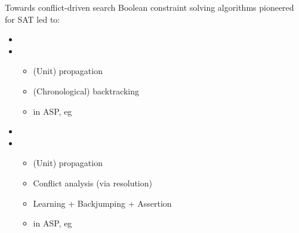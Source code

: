 \begin{frame}{Towards conflict-driven search}
  \bigskip
  Boolean constraint solving algorithms pioneered for SAT led to:
  \medskip
  \begin{itemize}\itemsep -1pt
  \item<1-> 
  \item<1-> [] 
    \begin{itemize}
    \item (Unit) propagation
    \item (Chronological) backtracking
    \medskip
    \item in ASP, eg \smodels\
    \end{itemize}
  \bigskip
  \item<1-> 
  \item<1-> [] 
    \begin{itemize}
    \item (Unit) propagation
    \item Conflict analysis (via resolution)
    \item Learning + Backjumping + Assertion
    \medskip
    \item in ASP, eg \clasp\
    \end{itemize}
  \end{itemize}
\end{frame}
%
